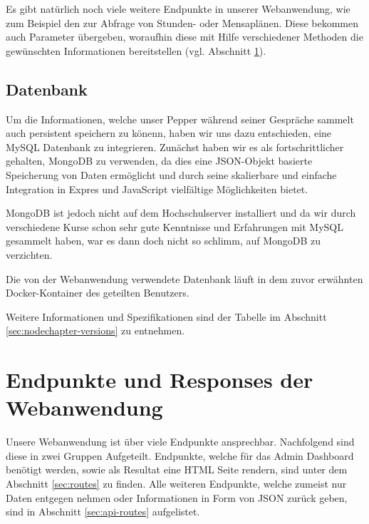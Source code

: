 Es gibt natürlich noch viele weitere Endpunkte in unserer Webanwendung, wie zum Beispiel den zur Abfrage von Stunden- oder Mensaplänen. Diese bekommen auch Parameter übergeben, woraufhin diese mit Hilfe verschiedener Methoden die gewünschten Informationen bereitstellen (vgl. Abschnitt \ref{sec:nodechapter-implementation-routes}).\\

\subsection{Datenbank}
\label{sec:nodechapter-database}
Um die Informationen, welche unser Pepper während seiner Gespräche sammelt auch persistent speichern zu könenn, haben wir uns dazu entschieden, eine MySQL Datenbank zu integrieren. Zunächst haben wir es als fortschrittlicher gehalten, MongoDB zu verwenden, da dies eine JSON-Objekt basierte Speicherung von Daten ermöglicht und durch seine skalierbare und einfache Integration in Expres und JavaScript vielfältige Möglichkeiten bietet.

MongoDB ist jedoch nicht auf dem Hochschulserver installiert und da wir durch verschiedene Kurse schon sehr gute Kenntnisse und Erfahrungen mit MySQL gesammelt haben, war es dann doch nicht so schlimm, auf MongoDB zu verzichten.

Die von der Webanwendung verwendete Datenbank läuft in dem zuvor erwähnten Docker-Kontainer des geteilten Benutzers.

Weitere Informationen und Spezifikationen sind der Tabelle im Abschnitt \ref{sec:nodechapter-versions} zu entnehmen.


\newpage
\section{Endpunkte und Responses der Webanwendung}
\label{sec:nodechapter-implementation-routes}
Unsere Webanwendung ist über viele Endpunkte ansprechbar. Nachfolgend sind diese in zwei Gruppen Aufgeteilt. Endpunkte, welche für das Admin Dashboard benötigt werden, sowie als Resultat eine HTML Seite rendern, sind unter dem Abschnitt \ref{sec:routes} zu finden. Alle weiteren Endpunkte, welche zumeist nur Daten entgegen nehmen oder Informationen in Form von JSON zurück geben, sind in Abschnitt \ref{sec:api-routes} aufgelistet.

